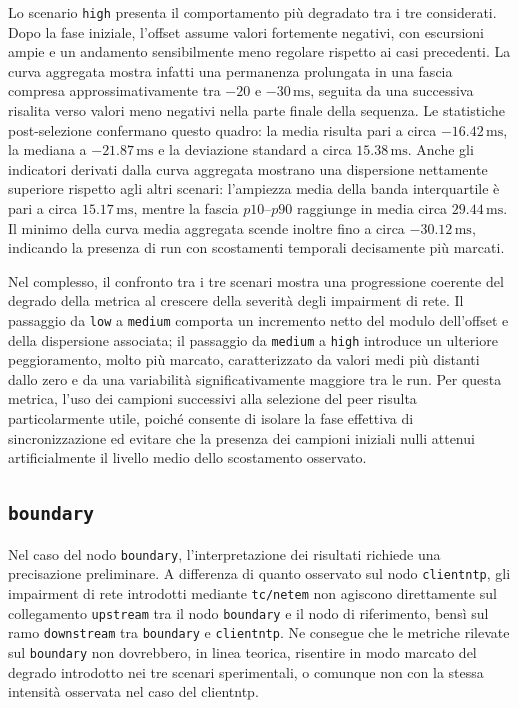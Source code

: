 Lo scenario \texttt{high} presenta il comportamento più degradato tra i tre
considerati. Dopo la fase iniziale, l’offset assume valori fortemente negativi, con
escursioni ampie e un andamento sensibilmente meno regolare rispetto ai casi precedenti.
La curva aggregata mostra infatti una permanenza prolungata in una fascia
compresa approssimativamente tra $-20$ e $-30\,\mathrm{ms}$, seguita da una successiva
risalita verso valori meno negativi nella parte finale della sequenza. Le
statistiche post-selezione confermano questo quadro: la media risulta pari a circa
$-16.42\,\mathrm{ms}$, la mediana a $-21.87\,\mathrm{ms}$ e la deviazione
standard a circa $15.38\,\mathrm{ms}$. Anche gli indicatori derivati dalla curva aggregata
mostrano una dispersione nettamente superiore rispetto agli altri scenari:
l’ampiezza media della banda interquartile è pari a circa $15.17\,\mathrm{ms}$, mentre
la fascia $p10$--$p90$ raggiunge in media circa $29.44\,\mathrm{ms}$. Il minimo della
curva media aggregata scende inoltre fino a circa $-30.12\,\mathrm{ms}$,
indicando la presenza di run con scostamenti temporali decisamente più marcati.

Nel complesso, il confronto tra i tre scenari mostra una progressione coerente del
degrado della metrica al crescere della severità degli impairment di rete. Il
passaggio da \texttt{low} a \texttt{medium} comporta un incremento netto del
modulo dell’offset e della dispersione associata; il passaggio da \texttt{medium}
a \texttt{high} introduce un ulteriore peggioramento, molto più marcato, caratterizzato
da valori medi più distanti dallo zero e da una variabilità significativamente maggiore
tra le run. Per questa metrica, l’uso dei campioni successivi alla selezione del peer
risulta particolarmente utile, poiché consente di isolare la fase effettiva di
sincronizzazione ed evitare che la presenza dei campioni iniziali nulli attenui
artificialmente il livello medio dello scostamento osservato.

\subsection{\texttt{boundary}}
Nel caso del nodo \texttt{boundary}, l’interpretazione dei risultati richiede
una precisazione preliminare. A differenza di quanto osservato sul nodo \texttt{clientntp},
gli impairment di rete introdotti mediante \texttt{tc/netem} non agiscono
direttamente sul collegamento \texttt{upstream} tra il nodo \texttt{boundary} e
il nodo di riferimento, bensì sul ramo \texttt{downstream} tra \texttt{boundary} e
\texttt{clientntp}. Ne consegue che le metriche rilevate sul \texttt{boundary}
non dovrebbero, in linea teorica, risentire in modo marcato del degrado
introdotto nei tre scenari sperimentali, o comunque non con la stessa intensità osservata
nel caso del clientntp.

